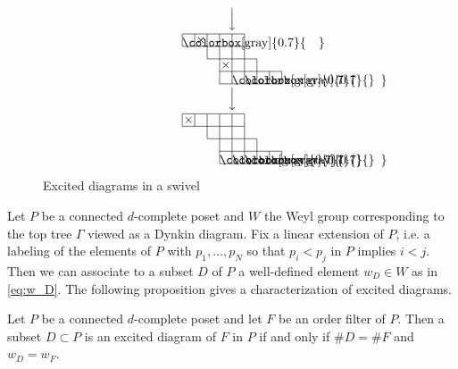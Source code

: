 \documentclass[ALCO,ThmDefs,Unicode,epreuves]{cedram}
\begin{document}
\begin{exam}
\begin{figure}[!htb]
$$\begin{CD}
@. @VVV
\\
@.
\raisebox{-20pt}{
\begin{picture}(80,40)
\fboxsep=0mm
\put(0,30){\colorbox[gray]{0.7}{\makebox(10,10){}}}
\put(40,0){\colorbox[gray]{0.7}{\makebox(10,10){}}}
\put(50,0){\colorbox[gray]{0.7}{\makebox(10,10){}}}
\put(0,40){\line(1,0){50}}
\put(0,30){\line(1,0){50}}
\put(20,20){\line(1,0){40}}
\put(30,10){\line(1,0){50}}
\put(30,0){\line(1,0){50}}
\put(0,30){\line(0,1){10}}
\put(10,30){\line(0,1){10}}
\put(20,20){\line(0,1){20}}
\put(30,0){\line(0,1){40}}
\put(40,0){\line(0,1){40}}
\put(50,0){\line(0,1){40}}
\put(60,0){\line(0,1){20}}
\put(70,0){\line(0,1){10}}
\put(80,0){\line(0,1){10}}
\put(10,30){\makebox(10,10){$\times$}}
\put(30,10){\makebox(10,10){$\times$}}
\end{picture}
}
\\
@. @VVV
\\
@.
\raisebox{-20pt}{
\begin{picture}(80,40)
\fboxsep=0mm
\put(30,0){\colorbox[gray]{0.7}{\makebox(10,10){}}}
\put(40,0){\colorbox[gray]{0.7}{\makebox(10,10){}}}
\put(50,0){\colorbox[gray]{0.7}{\makebox(10,10){}}}
\put(0,40){\line(1,0){50}}
\put(0,30){\line(1,0){50}}
\put(20,20){\line(1,0){40}}
\put(30,10){\line(1,0){50}}
\put(30,0){\line(1,0){50}}
\put(0,30){\line(0,1){10}}
\put(10,30){\line(0,1){10}}
\put(20,20){\line(0,1){20}}
\put(30,0){\line(0,1){40}}
\put(40,0){\line(0,1){40}}
\put(50,0){\line(0,1){40}}
\put(60,0){\line(0,1){20}}
\put(70,0){\line(0,1){10}}
\put(80,0){\line(0,1){10}}
\put(0,30){\makebox(10,10){$\times$}}
\end{picture}
}
\end{CD}
$$
\caption{Excited diagrams in a swivel}
\label{fig:swivel_excited}
\end{figure}
\end{exam}

Let $P$ be a connected $d$-complete poset 
and $W$ the Weyl group corresponding to the top tree $\Gamma$ viewed as a Dynkin diagram. 
Fix a linear extension of $P$, 
i.e. a labeling of the elements of $P$ with $p_1, \dots, p_N$ so that $p_i < p_j$ in $P$ 
implies $i < j$.
Then we can associate to a subset $D$ of $P$ a well-defined element $w_D \in W$ as in 
\eqref{eq:w_D}.
The following proposition gives a characterization of excited diagrams.

\begin{prop}
\label{prop:E=R}
Let $P$ be a connected $d$-complete poset and let $F$ be an order filter of $P$.
Then a subset $D \subset P$ is an excited diagram of $F$ in $P$ 
if and only if $\# D = \# F$ and $w_D = w_F$.
\end{prop}
\end{document}
